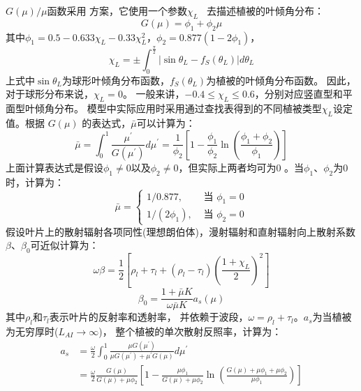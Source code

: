 $G(\mu) / \mu$函数采用 \citet{goudriaan1977crop} 方案，它使用一个参数$\chi_{L}$~\citep{ross1975radiative} 去描述植被的叶倾角分布：
\begin{equation}\label{Gmu}
G(\mu)=\phi_{1}+\phi_{2} \mu
\end{equation}
其中$\phi_{1}=0.5-0.633 \chi_{L}-0.33 \chi_{L}^{2}$，$\phi_{2}=0.877\left(1-2 \phi_{1}\right)$，
\begin{equation}
\chi_{L}=\pm \int_{0}^{\frac{\pi}{2}}\left|\sin \theta_{L}-f_{S}\left(\theta_{L}\right)\right| d \theta_{L}
\end{equation}
上式中$\sin \theta_{L}$为球形叶倾角分布函数，$f_{S}\left(\theta_{L}\right)$为植被的叶倾角分布函数。
因此，对于球形分布来说，$\chi_{L}=0$。 一般来讲，$-0.4 \leq \chi_{L} \leq 0.6$，分别对应竖直型和平面型叶倾角分布。
模型中实际应用时采用通过查找表得到的不同植被类型$\chi_{L}$设定值。根据 $G(\mu)$ 的表达式，$\bar{\mu}$可以计算为：
\begin{equation}
\bar{\mu}=\int_{0}^{1} \frac{\mu^{\prime}}{G\left(\mu^{\prime}\right)}
 d \mu^{\prime}=\frac{1}{\phi_{2}}\left[1-\frac{\phi_{1}}{\phi_{2}}
 \ln \left(\frac{\phi_{1}+\phi_{2}}{\phi_{1}}\right)\right]
\end{equation}
上面计算表达式是假设$\phi_{1} \neq 0$以及$\phi_{2} \neq 0$，但实际上两者均可为0 \citep{dai2004two}。当$\phi_{1}$、$\phi_{2}$为0时，计算为：
\begin{equation}
\bar{\mu}= \begin{cases} 
1 / 0.877, & \text { 当 } \phi_{1}=0 \\
1 /\left(2 \phi_{1}\right), & \text { 当 } \phi_{2}=0
\end{cases}
\end{equation}
假设叶片上的散射辐射各项同性(理想朗伯体)，漫射辐射和直射辐射向上散射系数$\beta$、$\beta_0$可近似计算为：
\begin{equation}
\omega \beta=\frac{1}{2}\left[\rho_{l}+\tau_{l}+\left(\rho_{l}-\tau_{l}\right)\left(\frac{1+\chi_{L}}{2}\right)^{2}\right]
\end{equation}
%
\begin{equation}\label{beta0}
\beta_{0}=\frac{1+\bar{\mu} K}{\omega \bar{\mu} K} a_{s}(\mu)
\end{equation}
其中$\rho_l$和$\tau_l$表示叶片的反射率和透射率，
并依赖于波段，$\omega=\rho_l+\tau_l$。$a_s$为当植被为无穷厚时($L_{AI}\rightarrow\infty$)，
整个植被的单次散射反照率，计算为：
\begin{equation}
\begin{aligned} 
a_{s} &=\frac{\omega}{2} \int_{0}^{1} \frac{\mu G\left(\mu^{\prime}\right)}{\mu G\left(\mu^{\prime}\right)+\mu^{\prime} 
G(\mu)} d \mu^{\prime} \\[1ex]
&=\frac{\omega}{2} \frac{G(\mu)}{G(\mu)+\mu \phi_{2}}\left[1-\frac{\mu \phi_{1}}{G(\mu)+\mu \phi_{2}} 
\ln \left(\frac{G(\mu)+\mu \phi_{1}+\mu \phi_{2}}{\mu \phi_{1}}\right)\right] 
\end{aligned}
\end{equation}

